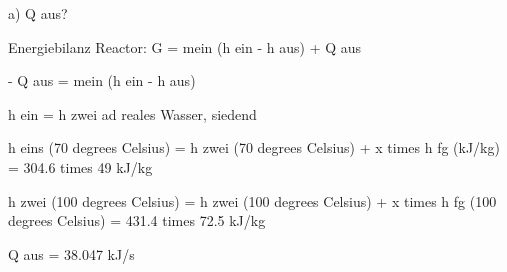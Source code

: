 a) Q aus?

Energiebilanz Reactor: G = mein (h ein - h aus) + Q aus

- Q aus = mein (h ein - h aus)

h ein = h zwei ad reales Wasser, siedend

h eins (70 degrees Celsius) = h zwei (70 degrees Celsius) + x times h fg (kJ/kg) = 304.6 times 49 kJ/kg

h zwei (100 degrees Celsius) = h zwei (100 degrees Celsius) + x times h fg (100 degrees Celsius) = 431.4 times 72.5 kJ/kg

Q aus = 38.047 kJ/s